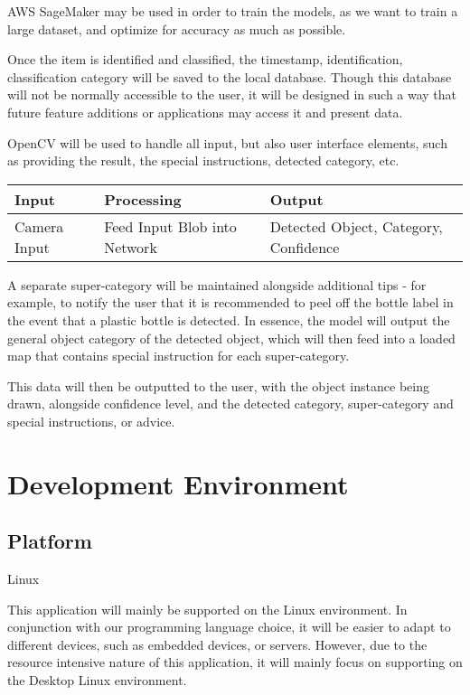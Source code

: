 \documentclass[conference]{IEEEtran}
\begin{document}
AWS SageMaker may be used in order to train the models, as we want to train a large dataset, and optimize for accuracy as much as possible.

Once the item is identified and classified, the timestamp, identification, classification category will be saved to the local database. Though this database will not be normally accessible to the user, it will be designed in such a way that future feature additions or applications may access it and present data.

OpenCV will be used to handle all input, but also user interface elements, such as providing the result, the special instructions, detected category, etc.

\begin{table}[htbp]
    \begin{tabular}{|p{2cm}|p{2.9cm}|p{2.9cm}|}
    \hline
    \textbf{Input} & \textbf{Processing} & \textbf{Output}\\ \hline
    Camera Input & Feed Input Blob into Network & Detected Object, Category, Confidence \\ \hline
    \end{tabular}
\end{table}

A separate super-category will be maintained alongside additional tips - for example, to notify the user that it is recommended to peel off the bottle label in the event that a plastic bottle is detected. In essence, the model will output the general object category of the detected object, which will then feed into a loaded map that contains special instruction for each super-category.

This data will then be outputted to the user, with the object instance being drawn, alongside confidence level, and the detected category, super-category and special instructions, or advice.

\newpage
\section{Development Environment}
\subsection{Platform}
\begin{center}
    Linux
\end{center}
This application will mainly be supported on the Linux environment. In conjunction with our programming language choice, it will be easier to adapt to different devices, such as embedded devices, or servers. However, due to the resource intensive nature of this application, it will mainly focus on supporting on the Desktop Linux environment. 
\end{document}
